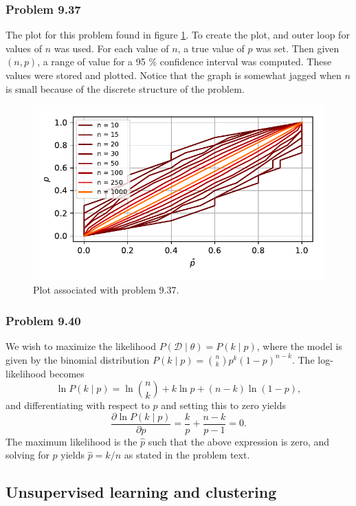 \documentclass[12pt, a4paper]{article}
\newcommand{\D}{\mathcal{D}}
\begin{document}
{\subsubsection*{Problem 9.37}
The plot for this problem found in figure \ref{fig:duda_ch9_prob37_k50}.
To create the plot, and outer loop for values of $n$ was used.
For each value of $n$, a true value of $p$ was set.
Then given $(n, p)$, a range of value for a 95 \% confidence interval was computed.
These values were stored and plotted.
Notice that the graph is somewhat jagged when $n$ is small because of the discrete structure of the problem.
	
\begin{figure}[ht!]
\centering
\includegraphics[width=0.7\linewidth]{figs/duda_ch9_prob37_k15}
\caption{Plot associated with problem 9.37.}
\label{fig:duda_ch9_prob37_k50}
\end{figure}

\subsubsection*{Problem 9.40}
We wish to maximize the likelihood $P(\D \mid \theta) = P(k \mid p)$, where the model is given by the binomial distribution 
$P(k \mid p) = \binom{n}{k} p^k (1-p)^{n-k}$.
The log-likelihood becomes
\begin{equation*}
	\ln P(k \mid p) = \ln \binom{n}{k} + k \ln p + (n-k) \ln (1-p),
\end{equation*}
and differentiating with respect to $p$ and setting this to zero yields
\begin{equation*}
\frac{\partial \ln P(k \mid p)}{\partial p} = \frac{k}{p} + \frac{n-k}{p-1} = 0.
\end{equation*}
The maximum likelihood is the $\hat{p}$ such that the above expression is zero, and solving for $p$ yields $\hat{p} = k / n$ as stated in the problem text.


\clearpage
\subsection{Unsupervised learning and clustering}

}
\end{document}
